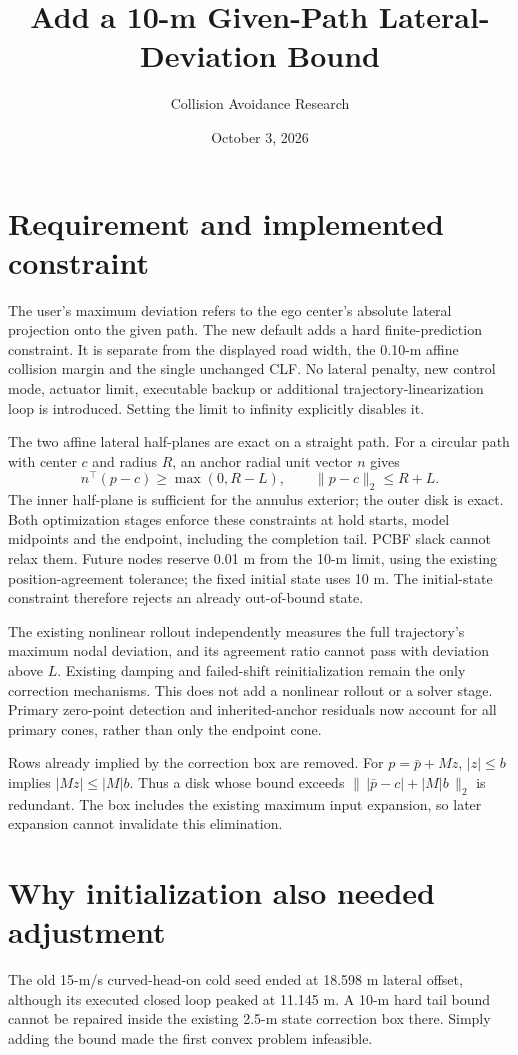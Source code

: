\documentclass[10pt]{article}
\title{Add a 10-m Given-Path Lateral-Deviation Bound}
\author{Collision Avoidance Research}
\date{October 3, 2026}
\begin{document}
\maketitle
\section{Requirement and implemented constraint}
The user's maximum deviation refers to the ego center's absolute lateral
projection onto the given path. The new default
 adds a hard finite-prediction
constraint. It is separate from the displayed road width, the 0.10-m affine
collision margin and the single unchanged CLF. No lateral penalty, new control
mode, actuator limit, executable backup or additional trajectory-linearization
loop is introduced. Setting the limit to infinity explicitly disables it.

The two affine lateral half-planes are exact on a straight path. For a circular
path with center $c$ and radius $R$, an anchor radial unit vector $n$ gives
\[
 n^\top(p-c)\ge\max(0,R-L),\qquad \|p-c\|_2\le R+L.
\]
The inner half-plane is sufficient for the annulus exterior; the outer disk is
exact. Both optimization stages enforce these constraints at hold starts,
model midpoints and the endpoint, including the completion tail. PCBF slack
cannot relax them. Future nodes reserve 0.01 m from the 10-m limit, using the
existing position-agreement tolerance; the fixed initial state uses 10 m.
The initial-state constraint therefore rejects an already out-of-bound state.

The existing nonlinear rollout independently measures the full trajectory's
maximum nodal deviation, and its agreement ratio cannot pass with deviation
above $L$. Existing damping and failed-shift reinitialization remain the only
correction mechanisms. This does not add a nonlinear rollout or a solver stage.
Primary zero-point detection and inherited-anchor residuals now account for
all primary cones, rather than only the endpoint cone.

Rows already implied by the correction box are removed. For $p=\bar p+Mz$,
$|z|\le b$ implies $|Mz|\le |M|b$. Thus a disk whose bound exceeds
$\|\,|\bar p-c|+|M|b\,\|_2$ is redundant. The box includes the existing maximum
input expansion, so later expansion cannot invalidate this elimination.

\section{Why initialization also needed adjustment}
The old 15-m/s curved-head-on cold seed ended at 18.598 m lateral offset,
although its executed closed loop peaked at 11.145 m. A 10-m hard tail bound
cannot be repaired inside the existing 2.5-m state correction box there.
Simply adding the bound made the first convex problem infeasible.
\end{document}
